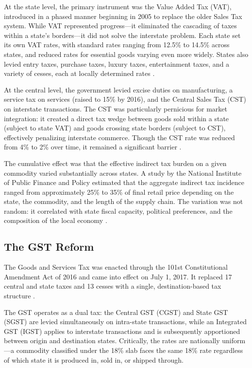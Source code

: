 \documentclass[12pt]{article}
\begin{document}
At the state level, the primary instrument was the Value Added Tax (VAT), introduced in a phased manner beginning in 2005 to replace the older Sales Tax system. While VAT represented progress---it eliminated the cascading of taxes within a state's borders---it did not solve the interstate problem. Each state set its own VAT rates, with standard rates ranging from 12.5\% to 14.5\% across states, and reduced rates for essential goods varying even more widely. States also levied entry taxes, purchase taxes, luxury taxes, entertainment taxes, and a variety of cesses, each at locally determined rates \citep{subramanian2014challenges}.

At the central level, the government levied excise duties on manufacturing, a service tax on services (raised to 15\% by 2016), and the Central Sales Tax (CST) on interstate transactions. The CST was particularly pernicious for market integration: it created a direct tax wedge between goods sold within a state (subject to state VAT) and goods crossing state borders (subject to CST), effectively penalizing interstate commerce. Though the CST rate was reduced from 4\% to 2\% over time, it remained a significant barrier \citep{stiglitz2010freefall}.

The cumulative effect was that the effective indirect tax burden on a given commodity varied substantially across states. A study by the National Institute of Public Finance and Policy estimated that the aggregate indirect tax incidence ranged from approximately 25\% to 35\% of final retail price depending on the state, the commodity, and the length of the supply chain. The variation was not random: it correlated with state fiscal capacity, political preferences, and the composition of the local economy \citep{rbi2018state}.

\subsection{The GST Reform}

The Goods and Services Tax was enacted through the 101st Constitutional Amendment Act of 2016 and came into effect on July 1, 2017. It replaced 17 central and state taxes and 13 cesses with a single, destination-based tax structure \citep{agarwal2017india}.

The GST operates as a dual tax: the Central GST (CGST) and State GST (SGST) are levied simultaneously on intra-state transactions, while an Integrated GST (IGST) applies to interstate transactions and is subsequently apportioned between origin and destination states. Critically, the rates are nationally uniform---a commodity classified under the 18\% slab faces the same 18\% rate regardless of which state it is produced in, sold in, or shipped through.
\end{document}
